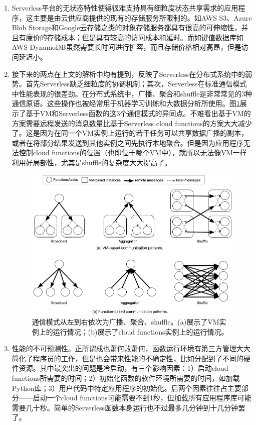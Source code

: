 \documentclass[11pt]{article}
\begin{document}
\begin{enumerate}
	\item Serverless平台的无状态特性使得很难支持具有细粒度状态共享需求的应用程序，这主要是由云供应商提供的现有的存储服务所限制的。如AWS S3、Azure Blob Storage和Google云存储之类的对象存储服务都具有很高的可伸缩性，并且有廉价的存储成本；但是具有较高的访问成本和延时。而如键值数据库如AWS DynamoDB虽然需要长时间进行扩容，而且存储价格相对高昂，但是访问延迟小。
	\item 接下来的两点在上文的\cite{hellerstein2018serverless}解析中均有提到，反映了Serverless在分布式系统中的弱势。首先Serverless缺乏细粒度的协调机制；其次，Serverless在标准通信模式中性能表现的很差劲。在分布式系统中，广播、聚合和shuffle是非常常见的3种通信原语。这些操作也被经常用于机器学习训练和大数据分析所使用。图\ref{figs:pattern}展示了基于VM和Serverless函数的这3个通信模式的异同点。不难看出基于VM的方案需要远程发送的消息数量比基于Serverless cloud functions的方案大大减少了。这是因为在同一个VM实例上运行的若干任务可以共享数据广播的副本，或者在将部分结果发送到其他实例之间先执行本地聚合。但是因为应用程序无法控制cloud functions的位置（也即位于哪个VM中），就所以无法像VM一样利用好局部性，尤其是shuffle的复杂度大大提高了。
	\begin{figure}[!htbp]
		\centering
		\includegraphics[width=0.6\linewidth]{figs/pattern}
		\caption{通信模式从左到右依次为广播、聚合、shuffle。(a)展示了VM实例上的运行情况；(b)展示了cloud functions实例上的运行情况。}
		\label{figs:pattern}
	\end{figure}
	\item 性能的不可预测性。正所谓成也萧何败萧何，函数运行环境有第三方管理大大简化了程序员的工作，但是也会带来性能的不确定性，比如分配到了不同的硬件资源。其中最突出的问题是冷启动，有三个影响因素：1）启动cloud functions所需要的时间；2）初始化函数的软件环境所需要的时间，如加载Python库；3）用户代码中特定应用程序的初始化。后两个因素往往占主要部分——启动一个cloud functions可能需要不到1秒，但加载所有应用程序库可能需要几十秒。简单的Serverless函数本身运行也不过最多几分钟到十几分钟罢了。
\end{enumerate}
\end{document}
